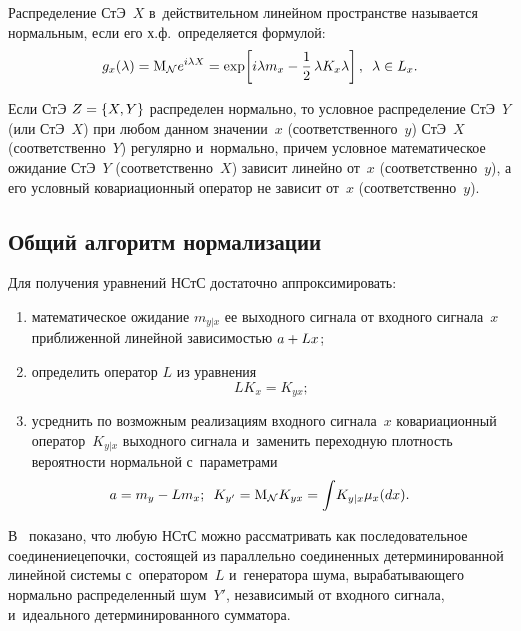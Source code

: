 \begin{multicols}{2}
Распределение СтЭ~$X$ в~действительном линейном пространстве называется нормальным, если его х.ф.\ 
определяется формулой:
\begin{equation*}
    g_x (\lambda) =\mathrm{M}_{\cal N} e^{i\lambda X} = \exp \!\left[ i\lambda m_x - \displaystyle\frac{\displaystyle 1\mathstrut}{\displaystyle 2\mathstrut}\,\lambda K_x \lambda\right],\enskip 
    \lambda\in L_x.
\end{equation*}

 Если СтЭ $Z\hm=\lf X,Y\rf$ распределен нормально, то условное распределение СтЭ~$Y$ 
 (или СтЭ~$X$) при любом данном значении~$x$ (соответственного~$y$) СтЭ~$X$ (соответственно~$Y$) 
 регулярно и~нормально, причем условное математическое ожидание СтЭ~$Y$ (соответственно~$X$) 
 зависит линейно от~$x$ (соответственно~$y$), а его услов\-ный ковариационный оператор не зависит от~$x$ 
 (соответственно~$y$).

\subsection{Общий алгоритм нормализации} 

Для получения уравнений НСтС достаточно аппроксимировать:
\begin{enumerate}[(1)]
\item математическое ожидание  $m_{y|x}$ ее выходного сигнала 
от входного сигнала~$x$ приближенной линейной зависимостью $a\hm+Lx$;

\item определить оператор $L$ из уравнения
\begin{equation*}
LK_x = K_{yx};
    \end{equation*}

\item усреднить по возможным реализациям входного сигнала~$x$ ковариационный оператор~$K_{y|x}$ 
выходного сигнала и~заменить переходную плот\-ность вероятности нормальной с~па\-ра\-мет\-рами
\begin{equation*}
    \hspace*{-6mm}a=m_y - Lm_x; \enskip K_{y'} =\mathrm{M}_{\cal N} K_{yx} = \int \! K_{y|x} \mu_x (dx).
\end{equation*}
    \end{enumerate}

В~\cite{6-sin, 7-sin, 8-sin, 9-sin} показано, что любую НСтС можно рассматривать как 
последовательное соединение\linebreak цепочки, со\-сто\-ящей из параллельно соединенных детерминированной 
линейной сис\-те\-мы с~оператором~$L$ и~генератора шума, вырабатывающего нормально распределенный шум~$Y'$, 
независимый от входного сигнала, и~идеального детерминированного сумматора.


\end{multicols}
